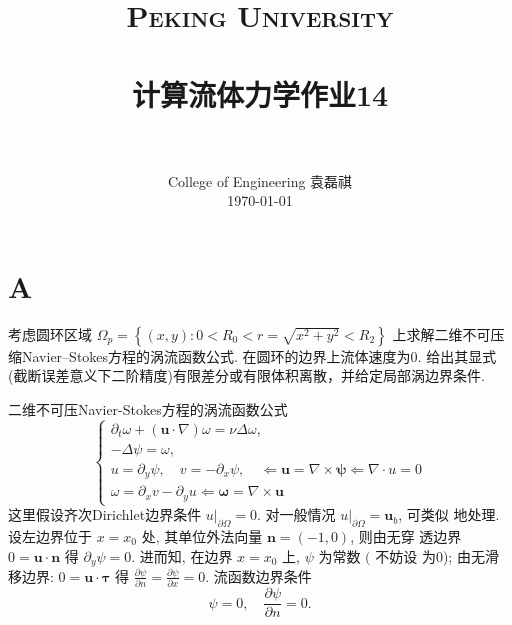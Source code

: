 \documentclass[12pt]{article}
\title{
		\vspace{-1in} 	
		\usefont{OT1}{bch}{b}{n}
		\normalfont \normalsize \textsc{\LARGE Peking University}\\[0.2cm] %
		\horrule{0.5pt} \\[0.2cm]
		\huge \bfseries{计算流体力学作业14} \\[-0.2cm]
		\horrule{2pt} \\[0.2cm]
}
\author{
		\normalfont 								\normalsize
		College of Engineering \quad 2001111690  \quad 袁磊祺\\	\normalsize
        \today
}
\date{}
\begin{document}


\maketitle

\section{A}

考虑圆环区域 $\Omega_{p}=\left\{(x, y): 0<R_{0}<r=\sqrt{x^{2}+y^{2}}<R_{2}\right\}$ 上求解二维不可压缩Navier--Stokes方程的涡流函数公式. 在圆环的边界上流体速度为0. 给出其显式(截断误差意义下二阶精度)有限差分或有限体积离散，并给定局部涡边界条件.


二维不可压Navier-Stokes方程的涡流函数公式
\begin{equation}
	\left\{
	\begin{array}{l}
		\partial_{t} \omega+(\boldsymbol{u} \cdot \nabla) \omega=\nu \Delta \omega,                                                                          \\
		-\Delta \psi=\omega,                                                                                                                                 \\
		u=\partial_{y} \psi, \quad v=-\partial_{x} \psi, \quad \Longleftarrow \boldsymbol{u}=\nabla \times \boldsymbol{\psi} \Longleftarrow \nabla \cdot u=0 \\
		\omega=\partial_{x} v-\partial_{y} u \Longleftarrow \boldsymbol{\omega}=\nabla \times \boldsymbol{u}
	\end{array}\right.
	\label{eq:A1}
\end{equation}
这里假设齐次Dirichlet边界条件 $\left.u\right|_{\partial \Omega}=0 .$ 对一般情况 $\left.u\right|_{\partial \Omega}=\boldsymbol{u}_{b}$, 可类似 地处理. 设左边界位于 $x=x_{0}$ 处, 其单位外法向量 $\boldsymbol{n}=(-1,0)$, 则由无穿 透边界 $0=\boldsymbol{u} \cdot \boldsymbol{n}$ 得 $\partial_{y} \psi=0 .$ 进而知, 在边界 $x=x_{0}$ 上, $\psi$ 为常数 $($ 不妨设 为0); 由无滑移边界: $0=\boldsymbol{u} \cdot \boldsymbol{\tau}$ 得 $\frac{\partial \psi}{\partial n}=\frac{\partial \psi}{\partial x}=0.$
流函数边界条件
\begin{equation}
	\psi=0, \quad \frac{\partial \psi}{\partial n}=0.
\end{equation}
\end{document}
